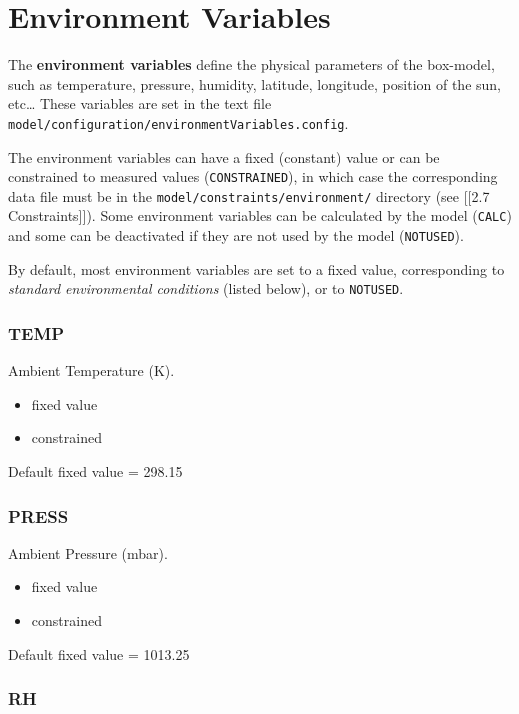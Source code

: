 \chapter{Environment Variables}

The \textbf{environment variables} define the physical parameters of the
box-model, such as temperature, pressure, humidity, latitude, longitude,
position of the sun, etc\ldots{} These variables are set in the text
file \texttt{model/configuration/environmentVariables.config}.

The environment variables can have a fixed (constant) value or can be
constrained to measured values (\texttt{CONSTRAINED}), in which case the
corresponding data file must be in the
\texttt{model/constraints/environment/} directory (see {[}{[}2.7
Constraints{]}{]}). Some environment variables can be calculated by the
model (\texttt{CALC}) and some can be deactivated if they are not used
by the model (\texttt{NOTUSED}).

By default, most environment variables are set to a fixed value,
corresponding to \emph{standard environmental conditions} (listed
below), or to \texttt{NOTUSED}.

\hypertarget{temp}{%
\subsection{TEMP}\label{temp}}

Ambient Temperature (K).

\begin{itemize}
\tightlist
\item
  fixed value
\item
  constrained
\end{itemize}

Default fixed value = 298.15

\hypertarget{press}{%
\subsection{PRESS}\label{press}}

Ambient Pressure (mbar).

\begin{itemize}
\tightlist
\item
  fixed value
\item
  constrained
\end{itemize}

Default fixed value = 1013.25

\hypertarget{rh}{%
\subsection{RH}\label{rh}}

